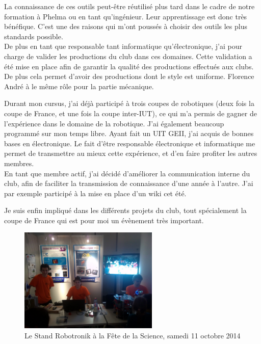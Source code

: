 \documentclass[a4paper,11pt]{article} \usepackage[T1]{fontenc} \usepackage[utf8]{inputenc} \usepackage[francais]{babel}
\begin{document}
La connaissance de ces outils peut-être réutilisé plus tard dans le cadre de notre formation à Phelma ou en tant qu'ingénieur. Leur apprentissage est donc très bénéfique. C'est une des raisons qui m'ont poussés à choisir des outils les plus standards possible.\\

    De plus en tant que responsable tant informatique qu'électronique, j'ai pour charge de valider les productions du club dans ces domaines. Cette validation a été mise en place afin de garantir la qualité des productions effectués aux clubs. De plus cela permet d'avoir des productions dont le style est uniforme. Florence André à le même rôle pour la partie mécanique.

    Durant mon cursus, j'ai déjà participé à  trois coupes de robotiques (deux fois la coupe de France, et une fois la coupe inter-IUT), ce qui m'a permis de gagner de l'expérience dans le domaine de la robotique. J'ai également beaucoup programmé sur mon temps libre. Ayant fait un UIT GEII, j'ai acquis de bonnes bases en électronique. Le fait d'être responsable électronique et informatique me permet de transmettre au mieux cette expérience, et d'en faire profiter les autres membres.\\

    En tant que membre actif, j'ai décidé d'améliorer la communication interne du club, afin de faciliter la transmission de connaissance d'une année à l'autre. J'ai par exemple participé à la mise en place d'un wiki cet été.

    Je suis enfin impliqué dans les différents projets du club, tout spécialement la coupe de France qui est pour moi un évènement très important.

    \begin{figure}[h] \begin{center} \includegraphics[width=250px]{Images/FeteDeLaScience}
        \caption{Le Stand Robotronik à la Fête de la Science, samedi 11 octobre 2014} \end{center} \end{figure}
\end{document}

